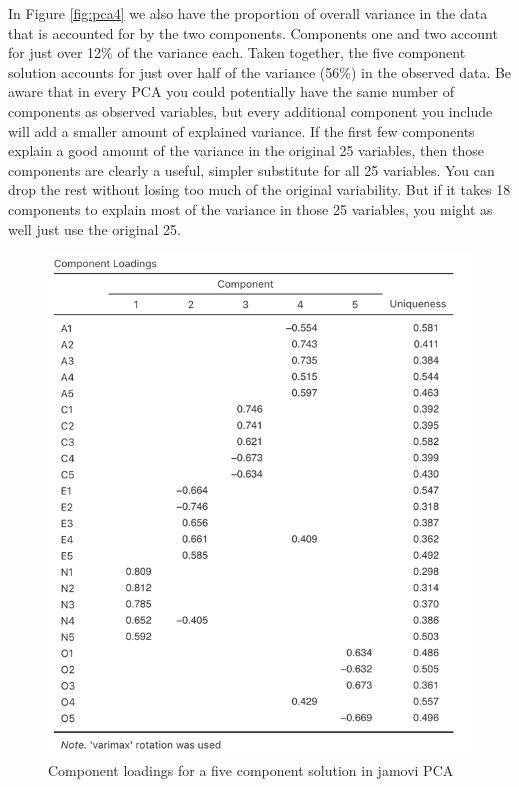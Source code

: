 \documentclass[
]{book}
\begin{document}
In Figure \ref{fig:pca4} we also have the proportion of overall variance in the data that is accounted for by the two components. Components one and two account for just over 12\% of the variance each. Taken together, the five component solution accounts for just over half of the variance (56\%) in the observed data. Be aware that in every PCA you could potentially have the same number of components as observed variables, but every additional component you include will add a smaller amount of explained variance. If the first few components explain a good amount of the variance in the original 25 variables, then those components are clearly a useful, simpler substitute for all 25 variables. You can drop the rest without losing too much of the original variability. But if it takes 18 components to explain most of the variance in those 25 variables, you might as well just use the original 25.

\begin{figure}

{\centering \includegraphics[width=1\linewidth]{img/factoranalysis/pca5} 

}

\caption{Component loadings for a five component solution in jamovi PCA}\label{fig:pca5}
\end{figure}
\end{document}
